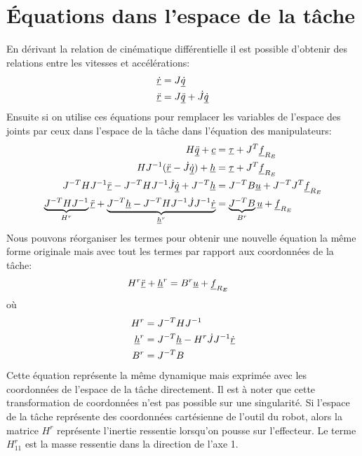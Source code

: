 \newpage
\section{Équations dans l'espace de la tâche}
\label{sec:taskdynamics}

En dérivant la relation de cinématique différentielle il est possible d'obtenir des relations entre les vitesses et accélérations:
\begin{align}
\underline{\dot{r}} &= J \underline{\dot{q}} \\
\underline{\ddot{r}} &= J \underline{\ddot{q}}  + \dot{J} \underline{\dot{q}} 
\end{align}
Ensuite si on utilise ces équations pour remplacer les variables de l'espace des joints par ceux dans l'espace de la tâche dans l'équation des manipulateurs:
\begin{align}
H \underline{\ddot{q}} + \underline{c} &= \underline{\tau} + J^T \underline{f}_{R_E} \\
H J^{-1} (\underline{\ddot{r}} - \dot{J} \underline{\dot{q}}) + \underline{h} &= \underline{\tau} + J^T \underline{f}_{R_E} \\
J^{-T} H J^{-1} \underline{\ddot{r}} -  J^{-T} H J^{-1} \dot{J} \underline{\dot{q}} + J^{-T} \underline{h} &= J^{-T} B \underline{u} + J^{-T} J^T \underline{f}_{R_E} \\
\underbrace{
J^{-T} H J^{-1} 
}_{H^r}
\underline{\ddot{r}} +  
\underbrace{
J^{-T} \underline{h} 
-
J^{-T} H J^{-1} \dot{J} J^{-1} 
\underline{\dot{r}} 
}_{\underline{h}^r}
&= 
\underbrace{
J^{-T} 
B
}_{B^r}
\underline{u} + \underline{f}_{R_E} 
\end{align}
Nous pouvons réorganiser les termes pour obtenir une nouvelle équation la même forme originale mais avec tout les termes par rapport aux coordonnées de la tâche:
\begin{align}
H^r
\underline{\ddot{r}} +  
\underline{h}^r
&= B^{r} \underline{u} + \underline{f}_{R_E} 
\end{align}
où
\begin{align}
H^r & = J^{-T} H J^{-1} \\
\underline{h}^r & = J^{-T} \underline{h}  - H^r \dot{J} J^{-1} \underline{\dot{r}}  \\
B^r & = J^{-T} B
\end{align}
Cette équation représente la même dynamique mais exprimée avec les coordonnées de l'espace de la tâche directement. Il est à noter que cette transformation de coordonnées n'est pas possible sur une singularité. Si l'espace de la tâche représente des coordonnées cartésienne de l'outil du robot, alors la matrice $H^r$ représente l'inertie ressentie lorsqu'on pousse sur l'effecteur. Le terme $H^r_{11}$ est la masse ressentie dans la direction de l'axe 1. 




